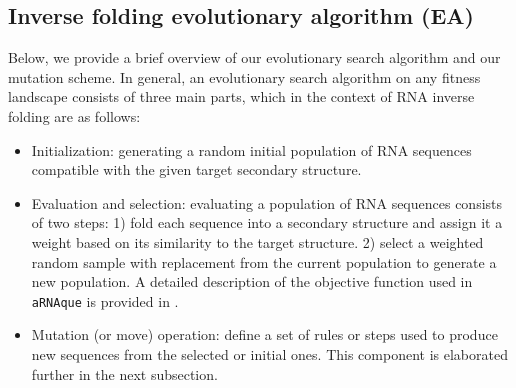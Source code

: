 \subsection{Inverse folding evolutionary algorithm (EA)}
Below, we provide a brief overview of our evolutionary search algorithm and our mutation scheme. 
In general, an evolutionary search algorithm on any fitness landscape consists of three main parts, which in the context of RNA inverse folding are as follows: %
\begin{itemize}
	\item Initialization: generating a random initial population of RNA sequences compatible with the given target secondary structure.
	\item Evaluation and selection: evaluating a population of RNA sequences consists of two steps: 1) fold each sequence into a secondary structure and assign it a weight based on its similarity to the target structure. 2) select a weighted random sample with replacement from the current population to generate a new population. A detailed description of the objective function used in \texttt{aRNAque} is provided in \cite{merleau2021simple}. 
	\item Mutation (or move) operation: define a set of rules or steps used to produce new sequences from the selected or initial ones. This component is elaborated further in the next subsection.
	
\end{itemize}


